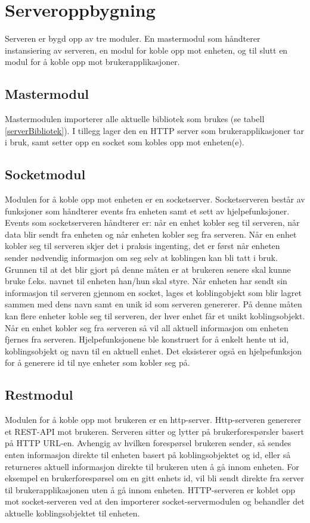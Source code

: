 \documentclass[12pt]{report}
\begin{document}
\section{Serveroppbygning}
Serveren er bygd opp av tre moduler. En mastermodul som håndterer instansiering av serveren, en modul for koble opp mot enheten, og til slutt en modul for å koble opp mot brukerapplikasjoner. 

\subsection{Mastermodul}
Mastermodulen importerer alle aktuelle bibliotek som brukes (se tabell \ref{serverBibliotek}). I tillegg lager den en HTTP server som brukerapplikasjoner tar i bruk, samt setter opp en socket som kobles opp mot enheten(e).

\subsection{Socketmodul}
Modulen for å koble opp mot enheten er en socketserver. Socketserveren består av funksjoner som håndterer events fra enheten samt et sett av hjelpefunksjoner. Events som socketserveren håndterer er: når en enhet kobler seg til serveren, når data blir sendt fra enheten og når enheten kobler seg fra serveren. Når en enhet kobler seg til serveren skjer det i praksis ingenting, det er først når enheten sender nødvendig informasjon om seg selv at koblingen kan bli tatt i bruk. Grunnen til at det blir gjort på denne måten er at brukeren senere skal kunne bruke f.eks. navnet til enheten han/hun skal styre. Når enheten har sendt sin informasjon til serveren gjennom en socket, lages et koblingobjekt som blir lagret sammen med dens navn samt en unik id som serveren genererer. På denne måten kan flere enheter koble seg til serveren, der hver enhet får et unikt koblingsobjekt. Når en enhet kobler seg fra serveren så vil all aktuell informasjon om enheten fjernes fra serveren. Hjelpefunksjonene ble konstruert for å enkelt hente ut id, koblingsobjekt og navn til en aktuell enhet. Det eksisterer også en hjelpefunksjon for å generere id til nye enheter som kobler seg på. 

\subsection{Restmodul}
Modulen for å koble opp mot brukeren er en http-server. Http-serveren genererer et REST-API mot brukeren. Serveren sitter og lytter på brukerforespørsler basert på HTTP URL-en. Avhengig av hvilken forespørsel brukeren sender, så sendes enten informasjon direkte til enheten basert på koblingsobjektet og id, eller så returneres aktuell informasjon direkte til brukeren uten å gå innom enheten. For eksempel en brukerforespørsel om en gitt enhets id, vil bli sendt direkte fra server til brukerapplikasjonen uten å gå innom enheten. HTTP-serveren er koblet opp mot socket-serveren ved at	den importerer socket-servermodulen og behandler det aktuelle koblingsobjektet til enheten.
\end{document}
